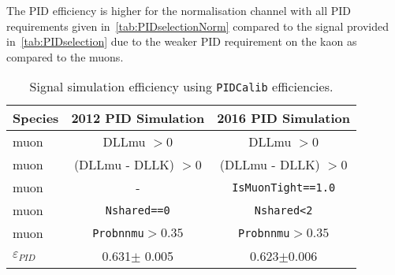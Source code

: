 The PID efficiency is higher for the normalisation channel with all PID requirements given in~\autoref{tab:PIDselectionNorm} compared to the signal provided in~\autoref{tab:PIDselection} due to the weaker PID requirement on the kaon as compared to the muons.

\begin{table}[H]
\begin{center}
\begin{tabular}{l c c}\toprule

    Species  & 2012 PID Simulation & 2016 PID Simulation\\ \hline
    muon &  DLLmu $ > 0$ & DLLmu $ > 0$ \\
    muon &  (DLLmu - DLLK) $ > 0$ & (DLLmu - DLLK) $ > 0$ \\
    muon &   - & \texttt{IsMuonTight==1.0}\\
    muon &  \texttt{Nshared==0} & \texttt{Nshared<2} \\
	muon &  \texttt{Probnnmu}$>0.35$ & \texttt{Probnnmu}$>0.35$ \\
     \hline
   $\varepsilon_{PID}$   & 0.631$\pm$ 0.005 & 0.623$\pm$0.006 \\

     \bottomrule
      \end{tabular}
\end{center}
\caption{Signal simulation efficiency using \texttt{PIDCalib} efficiencies.}
\label{tab:PIDselection}
\end{table}

